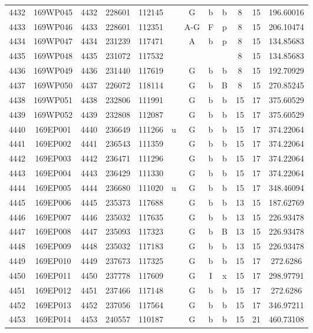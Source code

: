 \begin{tabular}{|*{12}{c|}}
4432 & 169WP045 & 4432 & 228601 & 112145 &  & G & b & b & 8 & 15 & 196.60016 \\ 
4433 & 169WP046 & 4433 & 228601 & 112351 &  & A-G & F & p & 8 & 15 & 206.10474 \\ 
4434 & 169WP047 & 4434 & 231239 & 117471 &  & A & b & p & 8 & 15 & 134.85683 \\ 
4435 & 169WP048 & 4435 & 231072 & 117532 &  &  &  &  & 8 & 15 & 134.85683 \\ 
4436 & 169WP049 & 4436 & 231440 & 117619 &  & G & b & b & 8 & 15 & 192.70929 \\ 
4437 & 169WP050 & 4437 & 226072 & 118114 &  & G & b & B & 8 & 15 & 270.85245 \\ 
4438 & 169WP051 & 4438 & 232806 & 111991 &  & G & b & b & 15 & 17 & 375.60529 \\ 
4439 & 169WP052 & 4439 & 232808 & 112087 &  & G & b & b & 15 & 17 & 375.60529 \\ 
4440 & 169EP001 & 4440 & 236649 & 111266 & u & G & b & b & 15 & 17 & 374.22064 \\ 
4441 & 169EP002 & 4441 & 236543 & 111359 &  & G & b & b & 15 & 17 & 374.22064 \\ 
4442 & 169EP003 & 4442 & 236471 & 111296 &  & G & b & b & 15 & 17 & 374.22064 \\ 
4443 & 169EP004 & 4443 & 236429 & 111330 &  & G & b & b & 15 & 17 & 374.22064 \\ 
4444 & 169EP005 & 4444 & 236680 & 111020 & u & G & b & b & 15 & 17 & 348.46094 \\ 
4445 & 169EP006 & 4445 & 235373 & 117688 &  & G & b & b & 13 & 15 & 187.62769 \\ 
4446 & 169EP007 & 4446 & 235032 & 117635 &  & G & b & b & 13 & 15 & 226.93478 \\ 
4447 & 169EP008 & 4447 & 235093 & 117323 &  & G & b & B & 13 & 15 & 226.93478 \\ 
4448 & 169EP009 & 4448 & 235032 & 117183 &  & G & b & b & 13 & 15 & 226.93478 \\ 
4449 & 169EP010 & 4449 & 237673 & 117325 &  & G & b & b & 15 & 17 & 272.6286 \\ 
4450 & 169EP011 & 4450 & 237778 & 117609 &  & G & I & x & 15 & 17 & 298.97791 \\ 
4451 & 169EP012 & 4451 & 237466 & 117148 &  & G & b & b & 15 & 17 & 272.6286 \\ 
4452 & 169EP013 & 4452 & 237056 & 117564 &  & G & b & b & 15 & 17 & 346.97211 \\ 
4453 & 169EP014 & 4453 & 240557 & 110187 &  & G & b & b & 15 & 21 & 460.73108 \\ 

\end{tabular}
